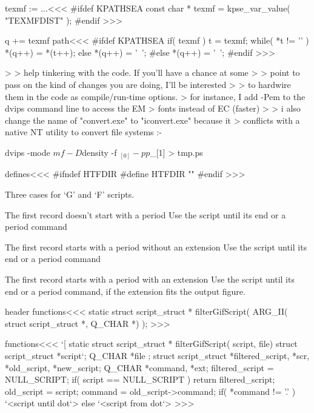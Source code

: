 {\<texmf := ...\><<<
#ifdef KPATHSEA   
const char * texmf = kpse_var_value( "TEXMFDIST" );
#endif
>>>

\<q += texmf path\><<<
#ifdef KPATHSEA   
   if( texmf ){
      t = texmf;
      while( *t != '\0' ){ *(q++) = *(t++); }
   } else {
      *(q++) = '~';
   }
#else
   *(q++) = '~';
#endif
>>>




\Verbatim

>  > help tinkering with the code.  If you'll have a chance at some
>  > point to pass on the kind of changes you are doing, I'll be interested
>  > to hardwire them in the code as compile/run-time options.
> for instance, I add -Pem to the dvips command line to access the EM
> fonts instead of EC (faster)
> 
> i also change the name of "convert.exe" to "iconvert.exe" because it
> conflicts with a native NT utility to convert file systems :-}

\EndVerbatim

\Verbatim
dvips -mode $mf -D $density -f $_[0] -pp $_[1] > tmp.ps
\EndVerbatim

\<defines\><<<      
#ifndef HTFDIR
#define HTFDIR      ""
#endif
>>>









Three cases for `G' and `F' scripts.

\List{}
\item
{The first record doesn't start with a period}
Use the script until its end or a period command
\item
{The first record starts with a period without an extension}
Use the script until its end or a period command
\item
{The first record starts with a period with an extension}
Use the script until its end or a period command, if the extension
fits the output figure.

\EndList


\<header functions\><<<
static struct script_struct  * filterGifScript(
        ARG_II( struct script_struct  *, Q_CHAR *) );
>>>

\<functions\><<<
`[
static struct script_struct * filterGifScript( script, file) 
                                   struct script_struct *script`;
                                                   Q_CHAR *file
;{                                         
                   struct script_struct *filtered_script, *scr,
                                                   *old_script,
                                                   *new_script;
                                         Q_CHAR *command, *ext;
   filtered_script = NULL_SCRIPT;
   if( script == NULL_SCRIPT )
       return filtered_script;
   old_script = script;
   command = old_script->command;
   if( *command != '.' ){
      `<script until dot`> 
   } else {
      `<script from dot`> 
   }   
}
>>>

